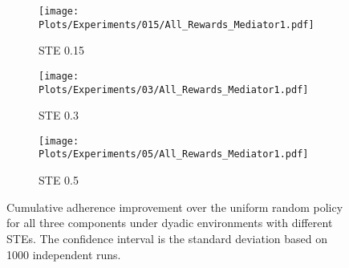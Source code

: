 \begin{figure}[h]
    \centering
    \begin{subfigure}[b]{0.32\textwidth}
        \texttt{[image: Plots/Experiments/015/All\_Rewards\_Mediator1.pdf]}
        \caption{STE 0.15}
    \end{subfigure}
    \begin{subfigure}[b]{0.32\textwidth}
        \texttt{[image: Plots/Experiments/03/All\_Rewards\_Mediator1.pdf]}
        \caption{STE 0.3}
    \end{subfigure}
    \begin{subfigure}[b]{0.32\textwidth}
        
        \texttt{[image: Plots/Experiments/05/All\_Rewards\_Mediator1.pdf]}
        \caption{STE 0.5}
    \end{subfigure}
    \caption{Cumulative adherence improvement over the uniform random policy for all three components under dyadic environments with different STEs. The confidence interval is the standard deviation based on 1000 independent runs.} 
\end{figure}


